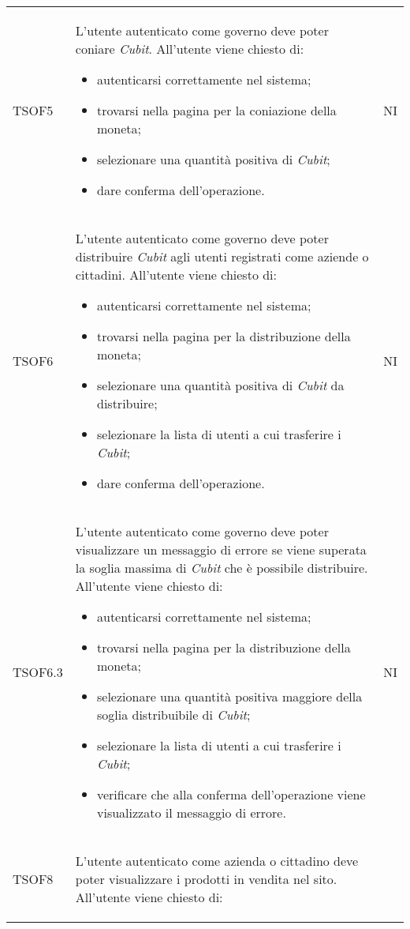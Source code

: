 \begin{table}[H]
\begin{longtable}{ >{\centering}p{} >{\centering}p{}
			>{\centering}p{}}
		TSOF5	&	L'utente autenticato come governo deve poter coniare \textit{Cubit\glo{}}.
		All'utente viene chiesto di:
		\begin{itemize}
			\item autenticarsi correttamente nel sistema;
			\item trovarsi nella pagina per la coniazione della moneta;
			\item selezionare una quantità positiva di \textit{Cubit\glo{}};
			\item dare conferma dell'operazione. 
		\end{itemize}	&	NI	\tabularnewline
		TSOF6	&	L'utente autenticato come governo deve poter distribuire \textit{Cubit\glo{}}
		agli utenti registrati come aziende o cittadini. All'utente viene chiesto di:
		\begin{itemize}
			\item autenticarsi correttamente nel sistema;
			\item trovarsi nella pagina per la distribuzione della moneta;
			\item selezionare una quantità positiva di \textit{Cubit\glo{}} da 
			distribuire;
			\item selezionare la lista di utenti a cui trasferire i \textit{Cubit\glo{}}; 
			\item dare conferma dell'operazione. 
		\end{itemize}	&	NI	\tabularnewline
		TSOF6.3	&	L'utente autenticato come governo deve poter visualizzare un messaggio
		di errore se viene superata la soglia massima di \textit{Cubit\glo{}} che è 
		possibile distribuire. All'utente viene chiesto di:
		\begin{itemize}
			\item autenticarsi correttamente nel sistema;
			\item trovarsi nella pagina per la distribuzione della moneta;
			\item selezionare una quantità positiva maggiore della soglia distribuibile 
			di \textit{Cubit\glo{}};
			\item selezionare la lista di utenti a cui trasferire i \textit{Cubit\glo{}}; 
			\item verificare che alla conferma dell'operazione viene visualizzato il 
			messaggio di errore.
		\end{itemize}	&	NI	\tabularnewline
		TSOF8	&	L'utente autenticato come azienda o cittadino deve poter visualizzare i
		prodotti in vendita nel sito. All'utente viene chiesto di:
		\begin{itemize}

\end{itemize}
\end{longtable}
\end{table}
